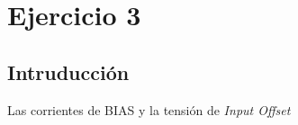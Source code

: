 
\section{Ejercicio 3}
\subsection{Intruducci\'on}
Las corrientes de  BIAS y la tensi\'on de \textit{Input Offset} 